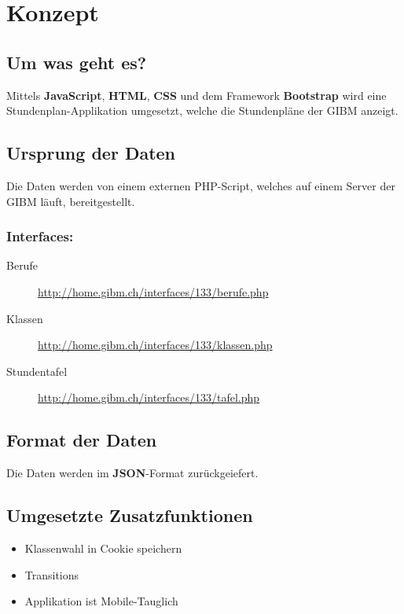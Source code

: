 \documentclass[11pt,a4paper,titlepage,portrait,ngerman,final]{scrartcl}
\title{\docTitle}
\subtitle{\docSubtitle}
\author{\large\scshape\docAuthor}
\date{\normalsize\scshape\docDate}
\begin{document}
\maketitle
\tableofcontents
\newpage
\section{Konzept}
\subsection{Um was geht es?}
Mittels \textbf{JavaScript}, \textbf{HTML}, \textbf{CSS} und dem Framework \textbf{Bootstrap} wird eine Stundenplan-Applikation umgesetzt, welche die Stundenpläne der GIBM anzeigt.

\subsection{Ursprung der Daten}
Die Daten werden von einem externen PHP-Script, welches auf einem Server der GIBM läuft, bereitgestellt.
\subsubsection*{Interfaces:}
\begin{description}
	\item[Berufe]{\url{http://home.gibm.ch/interfaces/133/berufe.php}}
	\item[Klassen]{\url{http://home.gibm.ch/interfaces/133/klassen.php}}
	\item[Stundentafel]{\url{http://home.gibm.ch/interfaces/133/tafel.php}}
\end{description}

\subsection{Format der Daten}
Die Daten werden im \textbf{JSON}-Format zurückgeiefert.
\subsection{Umgesetzte Zusatzfunktionen}
\begin{itemize}
\item Klassenwahl in Cookie speichern
\item Transitions
\item Applikation ist Mobile-Tauglich
\end{itemize}
\end{document}
